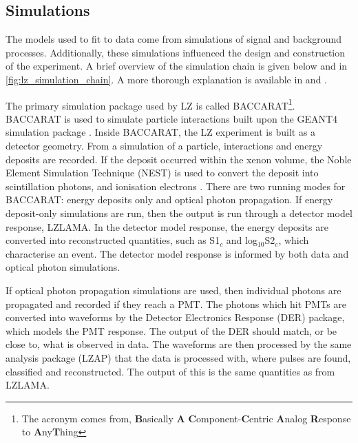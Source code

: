 \subsection{Simulations}
\label{sec:lz_simluations_chain}
\par
The models used to fit to data come from simulations of signal and background processes.
Additionally, these simulations influenced the design and construction of the experiment.
A brief overview of the simulation chain is given below and in \autoref{fig:lz_simulation_chain}.
A more thorough explanation is available in \cite{lz_simulations_ref} and \cite{theresafruth_thesis_ref}.
\par
The primary simulation package used by LZ is called BACCARAT\footnote{The acronym comes from, \textbf{B}asically \textbf{A} \textbf{C}omponent-\textbf{C}entric \textbf{A}nalog \textbf{R}esponse to \textbf{A}ny\textbf{T}hing}.
BACCARAT is used to simulate particle interactions built upon the GEANT4 simulation package \cite{geant4_geometry_ref}.
Inside BACCARAT, the LZ experiment is built as a detector geometry.
From a simulation of a particle, interactions and energy deposits are recorded.
If the deposit occurred within the xenon volume, the Noble Element Simulation Technique (NEST) is used to convert the deposit into scintillation photons, and ionisation electrons \cite{nest_1_ref}.
There are two running modes for BACCARAT: energy deposits only and optical photon propagation.
If energy deposit-only simulations are run, then the output is run through a detector model response, LZLAMA.
In the detector model response, the energy deposits are converted into reconstructed quantities, such as S1$_c$ and log$_{10}$S2$_c$, which characterise an event.
The detector model response is informed by both data and optical photon simulations.
\par
If optical photon propagation simulations are used, then individual photons are propagated and recorded if they reach a PMT.
The photons which hit PMTs are converted into waveforms by the Detector Electronics Response (DER) package, which models the PMT response.
The output of the DER should match, or be close to, what is observed in data.
The waveforms are then processed by the same analysis package (LZAP) that the data is processed with, where pulses are found, classified and reconstructed.
The output of this is the same quantities as from LZLAMA.


